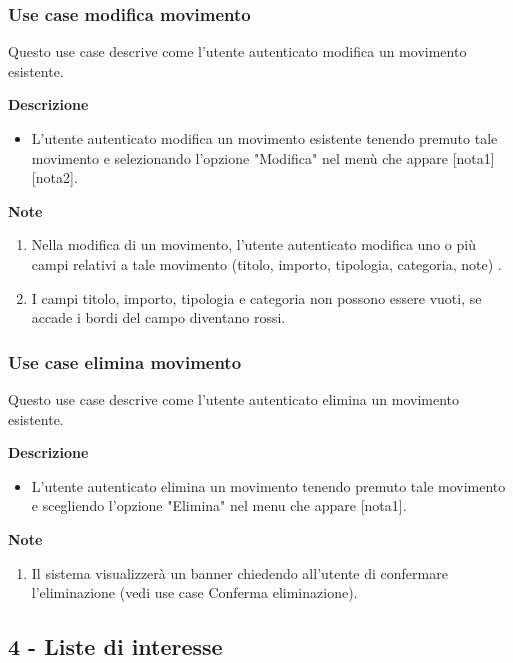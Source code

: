 \documentclass[a4paper,12pt]{article}
\begin{document}
\subsubsection*{Use case modifica movimento}

Questo use case descrive come l'utente autenticato modifica un movimento esistente.

\textbf{Descrizione}
\begin{itemize} \setlength\itemsep{0.01em}
\item L'utente autenticato modifica un movimento esistente tenendo premuto tale movimento e selezionando l'opzione "Modifica" nel menù che appare [nota1] [nota2].
\end{itemize}

\textbf{Note}
\begin{enumerate} \setlength\itemsep{0.01em}
\item Nella modifica di un movimento, l'utente autenticato modifica uno o più campi relativi a tale movimento (titolo, importo, tipologia, categoria, note) .
\item I campi titolo, importo, tipologia e categoria non possono essere vuoti, se accade i bordi del campo diventano rossi.
\end{enumerate}



\subsubsection*{Use case elimina movimento}

Questo use case descrive come l'utente autenticato elimina un movimento esistente.

\textbf{Descrizione}
\begin{itemize} \setlength\itemsep{0.01em}
\item L'utente autenticato elimina un movimento tenendo premuto tale movimento e scegliendo l'opzione "Elimina" nel menu che appare [nota1].
\end{itemize}

\textbf{Note}
\begin{enumerate} \setlength\itemsep{0.01em}
\item Il sistema visualizzerà un banner chiedendo all'utente di confermare l'eliminazione  (vedi use case Conferma eliminazione).
\end{enumerate}



\subsection*{4 - Liste di interesse}
\end{document}
